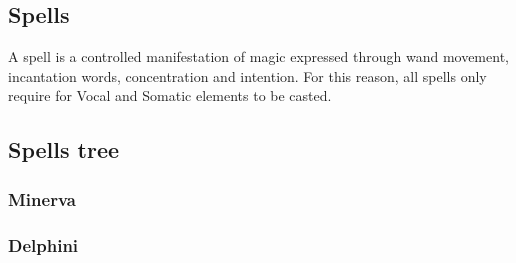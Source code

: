 \pagebreak
\subsection{Spells}
A spell is a controlled manifestation of magic expressed through wand movement, incantation words, concentration and intention. For this reason, all spells only require for Vocal and Somatic elements to be casted. \\












\subsection{Spells tree }
\subsubsection{Minerva}

\subsubsection{Delphini}
